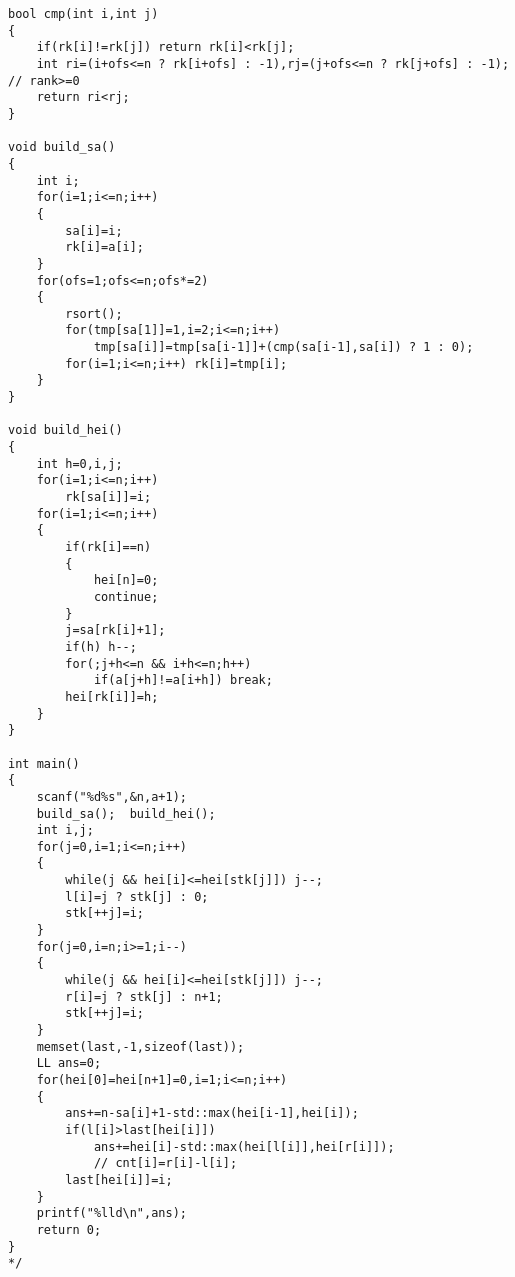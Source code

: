 \documentclass[a4paper,12pt]{article}
\begin{document}
\begin{lstlisting}
bool cmp(int i,int j)
{
    if(rk[i]!=rk[j]) return rk[i]<rk[j];
    int ri=(i+ofs<=n ? rk[i+ofs] : -1),rj=(j+ofs<=n ? rk[j+ofs] : -1);  // rank>=0
    return ri<rj;
}

void build_sa()
{
    int i;
    for(i=1;i<=n;i++)
    {
        sa[i]=i;
        rk[i]=a[i];
    }
    for(ofs=1;ofs<=n;ofs*=2)
    {
        rsort();
        for(tmp[sa[1]]=1,i=2;i<=n;i++)
            tmp[sa[i]]=tmp[sa[i-1]]+(cmp(sa[i-1],sa[i]) ? 1 : 0);
        for(i=1;i<=n;i++) rk[i]=tmp[i];
    }
}

void build_hei()
{
    int h=0,i,j;
    for(i=1;i<=n;i++)
        rk[sa[i]]=i;
    for(i=1;i<=n;i++)
    {
        if(rk[i]==n)
        {
            hei[n]=0;
            continue;
        }
        j=sa[rk[i]+1];
        if(h) h--;
        for(;j+h<=n && i+h<=n;h++)
            if(a[j+h]!=a[i+h]) break;
        hei[rk[i]]=h;
    }
}

int main()
{
    scanf("%d%s",&n,a+1);
    build_sa();  build_hei();
    int i,j;
    for(j=0,i=1;i<=n;i++)
    {
        while(j && hei[i]<=hei[stk[j]]) j--;
        l[i]=j ? stk[j] : 0;
        stk[++j]=i;
    }
    for(j=0,i=n;i>=1;i--)
    {
        while(j && hei[i]<=hei[stk[j]]) j--;
        r[i]=j ? stk[j] : n+1;
        stk[++j]=i;
    }
    memset(last,-1,sizeof(last));
    LL ans=0;
    for(hei[0]=hei[n+1]=0,i=1;i<=n;i++)
    {
        ans+=n-sa[i]+1-std::max(hei[i-1],hei[i]);
        if(l[i]>last[hei[i]])
            ans+=hei[i]-std::max(hei[l[i]],hei[r[i]]);
            // cnt[i]=r[i]-l[i];
        last[hei[i]]=i;
    }
    printf("%lld\n",ans);
    return 0;
}
*/
\end{lstlisting}
\end{document}
